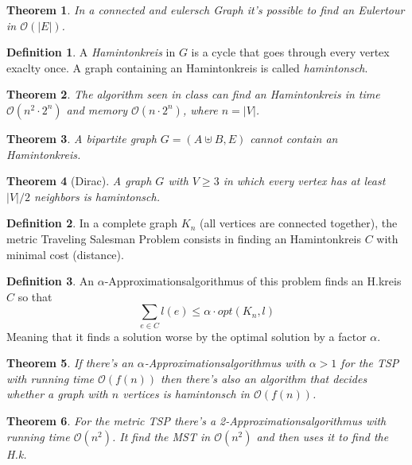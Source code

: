 \documentclass[12pt]{extarticle}
\theoremstyle{definition}
\newtheorem{definition}{Definition}
\theoremstyle{remark}
\theoremstyle{plain}
\newtheorem{theorem}{Theorem}
\newcommand{\BO}{\mathcal{O}}
\begin{document}
\begin{theorem}
    In a connected and eulersch Graph it's possible to find an Eulertour in $\BO(|E|)$.
\end{theorem}

\begin{definition}
    A \textit{Hamintonkreis} in $G$ is a cycle that goes through every vertex exaclty once.
    A graph containing an Hamintonkreis is called \textit{hamintonsch}.
\end{definition}

\begin{theorem}
    The algorithm seen in class can find an Hamintonkreis in time $\BO(n^2 \cdot 2^n)$ and memory $\BO(n \cdot 2^n)$, where $n = |V|$.
\end{theorem}

\begin{theorem}
    A bipartite graph $G = (A \uplus B, E)$ cannot contain an Hamintonkreis.
\end{theorem}

\begin{theorem}[Dirac]
    A graph $G$ with $V \ge 3$ in which every vertex has at least $|V|/2$ neighbors is \textit{hamintonsch}.
\end{theorem}

\begin{definition}
    In a complete graph $K_n$ (all vertices are connected together),
    the metric Traveling Salesman Problem consists in finding an
    Hamintonkreis $C$ with minimal cost (distance).
\end{definition}

\begin{definition}
    An $\alpha$-Approximationsalgorithmus of this problem finds an H.kreis $C$ so that
    \[ \sum_{e \in C} l(e) \le \alpha \cdot opt(K_n, l) \]
    Meaning that it finds a solution worse by the optimal solution by a factor $\alpha$.
\end{definition}

\begin{theorem}
    If there's an $\alpha$-Approximationsalgorithmus with $\alpha > 1$ for the TSP with running time $\BO(f(n))$ then there's
    also an algorithm that decides whether a graph with $n$ vertices is hamintonsch in $\BO(f(n))$.
\end{theorem}
\begin{theorem}
    For the metric TSP there's a 2-Approximationsalgorithmus with running time $\BO(n^2)$.
    It find the MST in $\BO(n^2)$ and then uses it to find the H.k.
\end{theorem}
\end{document}
